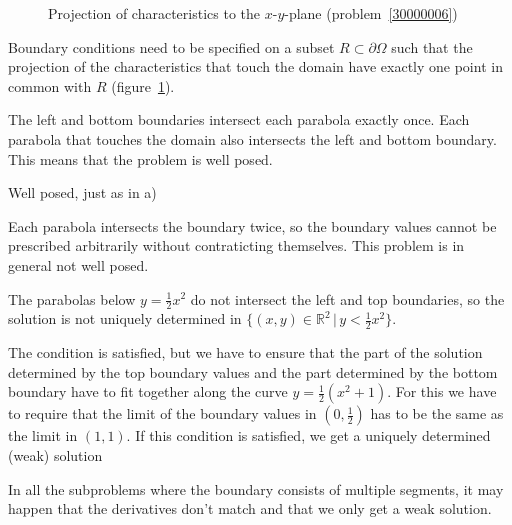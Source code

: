 \begin{loesung}
\begin{figure}
\begin{center}
\end{center}
\caption{Projection of characteristics to the $x$-$y$-plane
(problem~\ref{30000006})
\label{30000006:char}}
\end{figure}
Boundary conditions need to be specified on a subset
$R\subset \partial\Omega$ such that the projection of the
characteristics that touch the domain have exactly one
point in common with $R$
(figure~\ref{30000006:char}). 
\begin{teilaufgaben}
\item
The left and bottom boundaries intersect each parabola exactly once.
Each parabola that touches the domain also intersects the left and bottom
boundary.
This means that the problem is well posed.
\item
Well posed, just as in a)
\item
Each parabola intersects the boundary twice, so the boundary values
cannot be prescribed arbitrarily without contraticting themselves.
This problem is in general not well posed.
\item
The parabolas below $y=\frac12x^2$ do not intersect the left and top
boundaries, so the solution is not uniquely determined in
$\{(x,y)\in\mathbb R^2\,|\, y<\frac12x^2\}$.
\item 
The condition is satisfied, but we have to ensure that the part of
the solution determined by the top boundary values and the
part determined by the bottom boundary have to fit together along
the curve $y=\frac12(x^2+1)$.
For this we have to require that the limit of the boundary values
in $(0,\frac12)$ has to be the same as the limit in $(1,1)$.
If this condition is satisfied, we get a uniquely determined 
(weak) solution
\end{teilaufgaben}
In all the subproblems where the boundary consists of multiple segments,
it may happen that the derivatives don't match and that we only get
a weak solution.
\end{loesung}
